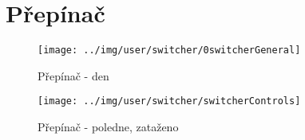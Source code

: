 
\section{Přepínač}



\begin{figure}[h!]\centering
\texttt{[image: ../img/user/switcher/0switcherGeneral]}

\caption{Přepínač - den}
\label{fig:user_switcher_0switcherGeneral}

\end{figure}

\begin{figure}[h!]\centering
\texttt{[image: ../img/user/switcher/switcherControls]}

\caption{Přepínač - poledne, zataženo}
\label{fig:user_switcher_switcherControls}

\end{figure}
